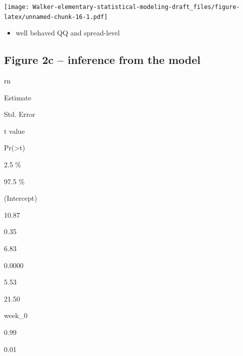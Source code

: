 \documentclass[]{book}
\newenvironment{Shaded}{\begin{snugshade}}{\end{snugshade}}
\newcommand{\DataTypeTok}[1]{\textcolor[rgb]{0.13,0.29,0.53}{#1}}
\newcommand{\DecValTok}[1]{\textcolor[rgb]{0.00,0.00,0.81}{#1}}
\newcommand{\ErrorTok}[1]{\textcolor[rgb]{0.64,0.00,0.00}{\textbf{#1}}}
\newcommand{\KeywordTok}[1]{\textcolor[rgb]{0.13,0.29,0.53}{\textbf{#1}}}
\newcommand{\NormalTok}[1]{#1}
\newcommand{\OperatorTok}[1]{\textcolor[rgb]{0.81,0.36,0.00}{\textbf{#1}}}
\newcommand{\OtherTok}[1]{\textcolor[rgb]{0.56,0.35,0.01}{#1}}
\newcommand{\StringTok}[1]{\textcolor[rgb]{0.31,0.60,0.02}{#1}}
\providecommand{\tightlist}{%
  \setlength{\itemsep}{0pt}\setlength{\parskip}{0pt}}
\begin{document}
\texttt{[image: Walker-elementary-statistical-modeling-draft\_files/figure-latex/unnamed-chunk-16-1.pdf]}

\begin{itemize}
\tightlist
\item
  well behaved QQ and spread-level
\end{itemize}

\hypertarget{figure-2c-inference-from-the-model}{%
\subsection{Figure 2c -- inference from the model}\label{figure-2c-inference-from-the-model}}

\begin{Shaded}
\end{Shaded}

rn

Estimate

Std. Error

t value

Pr(\textgreater\textbar t\textbar)

2.5 \%

97.5 \%

(Intercept)

10.87

0.35

6.83

0.0000

5.53

21.50

week\_0

0.99

0.01
\end{document}
